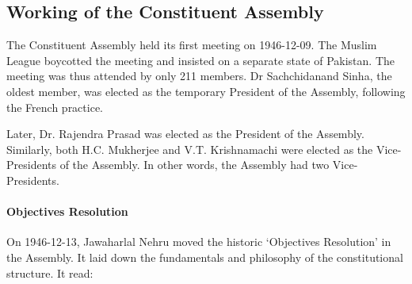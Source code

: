 \begin{multicol}{2}
\section{Working of the Constituent Assembly}

The Constituent Assembly held its first meeting on 1946-12-09. The Muslim League boycotted the meeting and insisted on a separate state of Pakistan. The meeting was thus attended by only 211 members. {Dr Sachchidanand Sinha, the oldest member, was elected as the temporary President of the Assembly, following the French practice.}

Later, Dr. Rajendra Prasad was elected as the President of the Assembly. Similarly, both H.C. Mukherjee and V.T. Krishnamachi were elected as the Vice-Presidents of the Assembly. In other words, the Assembly had two Vice-Presidents.

\paragraph{Objectives Resolution}

On 1946-12-13, Jawaharlal Nehru moved the historic `Objectives Resolution' in the Assembly. It laid down the fundamentals and philosophy of the constitutional structure. It read:


\end{multicol}
